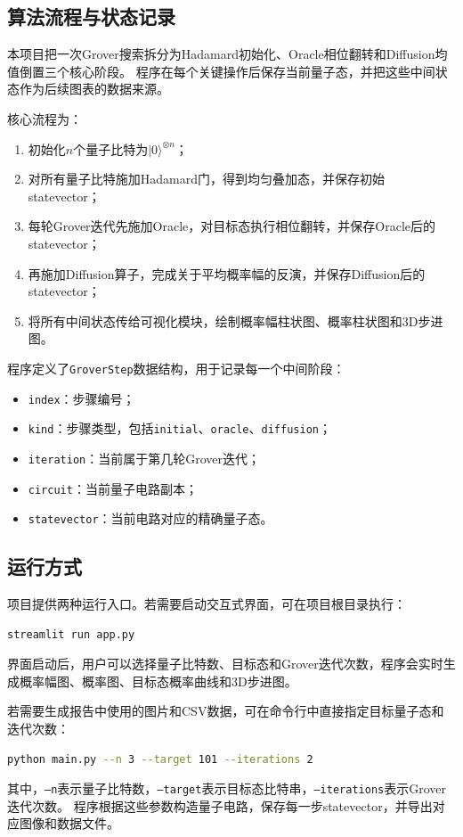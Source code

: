 \subsection{算法流程与状态记录}

本项目把一次Grover搜索拆分为Hadamard初始化、Oracle相位翻转和Diffusion均值倒置三个核心阶段。
程序在每个关键操作后保存当前量子态，并把这些中间状态作为后续图表的数据来源。

核心流程为：
\begin{enumerate}
  \item 初始化\(n\)个量子比特为\(|0\rangle^{\otimes n}\)；
  \item 对所有量子比特施加Hadamard门，得到均匀叠加态，并保存初始statevector；
  \item 每轮Grover迭代先施加Oracle，对目标态执行相位翻转，并保存Oracle后的statevector；
  \item 再施加Diffusion算子，完成关于平均概率幅的反演，并保存Diffusion后的statevector；
  \item 将所有中间状态传给可视化模块，绘制概率幅柱状图、概率柱状图和3D步进图。
\end{enumerate}

程序定义了\texttt{GroverStep}数据结构，用于记录每一个中间阶段：
\begin{itemize}
  \item \texttt{index}：步骤编号；
  \item \texttt{kind}：步骤类型，包括\texttt{initial}、\texttt{oracle}、\texttt{diffusion}；
  \item \texttt{iteration}：当前属于第几轮Grover迭代；
  \item \texttt{circuit}：当前量子电路副本；
  \item \texttt{statevector}：当前电路对应的精确量子态。
\end{itemize}

\subsection{运行方式}

项目提供两种运行入口。若需要启动交互式界面，可在项目根目录执行：
\begin{lstlisting}[language=bash]
streamlit run app.py
\end{lstlisting}

界面启动后，用户可以选择量子比特数、目标态和Grover迭代次数，程序会实时生成概率幅图、概率图、目标态概率曲线和3D步进图。

若需要生成报告中使用的图片和CSV数据，可在命令行中直接指定目标量子态和迭代次数：
\begin{lstlisting}[language=bash]
python main.py --n 3 --target 101 --iterations 2
\end{lstlisting}

其中，\texttt{--n}表示量子比特数，\texttt{--target}表示目标态比特串，\texttt{--iterations}表示Grover迭代次数。
程序根据这些参数构造量子电路，保存每一步statevector，并导出对应图像和数据文件。
